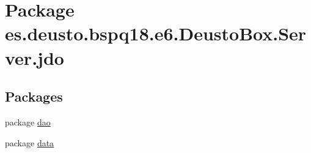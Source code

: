 \hypertarget{namespacees_1_1deusto_1_1bspq18_1_1e6_1_1_deusto_box_1_1_server_1_1jdo}{}\section{Package es.\+deusto.\+bspq18.\+e6.\+Deusto\+Box.\+Server.\+jdo}
\label{namespacees_1_1deusto_1_1bspq18_1_1e6_1_1_deusto_box_1_1_server_1_1jdo}
\subsection*{Packages}
\begin{DoxyCompactItemize}
\item 
package \mbox{\hyperlink{namespacees_1_1deusto_1_1bspq18_1_1e6_1_1_deusto_box_1_1_server_1_1jdo_1_1dao}{dao}}
\item 
package \mbox{\hyperlink{namespacees_1_1deusto_1_1bspq18_1_1e6_1_1_deusto_box_1_1_server_1_1jdo_1_1data}{data}}
\end{DoxyCompactItemize}

